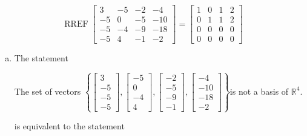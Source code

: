 \begin{exerciseAnswer} 


\[\operatorname{RREF} \left[\begin{array}{cccc}
3 & -5 & -2 & -4 \\
-5 & 0 & -5 & -10 \\
-5 & -4 & -9 & -18 \\
-5 & 4 & -1 & -2
\end{array}\right] = \left[\begin{array}{cccc}
1 & 0 & 1 & 2 \\
0 & 1 & 1 & 2 \\
0 & 0 & 0 & 0 \\
0 & 0 & 0 & 0
\end{array}\right] \]


\begin{enumerate}[(a)]
\item The statement 
\begin{center}\begin{minipage}{0.8\textwidth}
 The set of vectors \( \left\{ \left[\begin{array}{c}
3 \\
-5 \\
-5 \\
-5
\end{array}\right] , \left[\begin{array}{c}
-5 \\
0 \\
-4 \\
4
\end{array}\right] , \left[\begin{array}{c}
-2 \\
-5 \\
-9 \\
-1
\end{array}\right] , \left[\begin{array}{c}
-4 \\
-10 \\
-18 \\
-2
\end{array}\right] \right\} \)is not a basis of \(\mathbb{R}^4\). 
\end{minipage}\end{center}
     is equivalent to the statement 
\begin{center}\begin{minipage}{0.8\textwidth}
 The set of vectors \( \left\{ \left[\begin{array}{c}
3 \\

\end{array}
\end{minipage}
\end{center}
\end{enumerate}
\end{exerciseAnswer}
